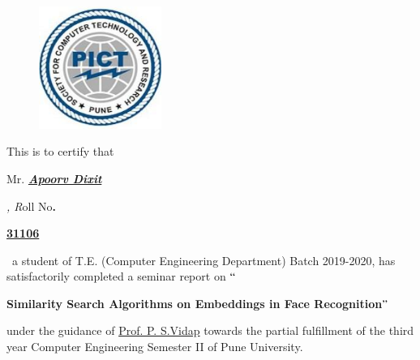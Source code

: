 \documentclass[12pt]{article}
\renewcommand{\_}{\kern-1.5pt\textunderscore\kern-1.5pt}
\begin{document}

\begin{figure}[H]
	\begin{Center}
		\includegraphics[width=1.57in,height=1.57in]{./media/image2.jpg}
	\end{Center}
\end{figure}



\begin{Center}
{\fontsize{14pt}{16.8pt}\selectfont  \par}
\end{Center}\par

\begin{justify}
{\fontsize{18pt}{21.6pt}\selectfont This is to certify that {\fontsize{20pt}{24.0pt}\selectfont Mr.\textit{ \textbf{\uline{Apoorv Dixit}} }{\fontsize{18pt}{21.6pt}\selectfont \textit{, R}oll No\textbf{. }{\fontsize{20pt}{24.0pt}\selectfont \textbf{\uline{31106}}{\fontsize{18pt}{21.6pt}\selectfont \  a student of T.E. (Computer Engineering Department) Batch 2019-2020, has satisfactorily completed a seminar report on $``${\fontsize{16pt}{19.2pt}\selectfont \textbf{Similarity Search Algorithms on Embeddings in Face Recognition$"$ }{\fontsize{18pt}{21.6pt}\selectfont  \tab under the guidance of \uline{Prof. P. S.Vidap} towards the partial fulfillment of the third year Computer Engineering Semester II of Pune University.\par}\par}\par}\par}\par}\par}\par}
\end{justify}\par

\begin{justify}
{\fontsize{18pt}{21.6pt}\selectfont  \par}
\end{justify}\par
\end{document}
